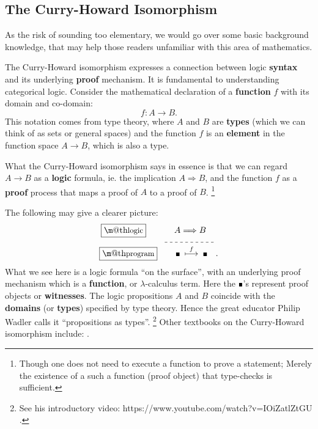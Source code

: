 \documentclass[orivec]{llncs}
\makeatletter
\newcommand{\witness}{\scalebox{0.6}{$\blacksquare$}}
\newcommand{\underdash}[1]{%
	\tikz[baseline=(toUnderline.base)]{
		\node[inner sep=1pt,outer sep=10pt] (toUnderline) {#1};
		\draw[dashed] ([yshift=-0pt]toUnderline.south west) -- ([yshift=-0pt]toUnderline.south east);
	}%
}%
\renewcommand{\boxed}[1]{\fbox{\m@th$\displaystyle\scalebox{0.9}{#1}$} \,}
\makeatother
\begin{document}
\subsection{The Curry-Howard Isomorphism}

As the risk of sounding too elementary, we would go over some basic background knowledge, that may help those readers unfamiliar with this area of mathematics.

The Curry-Howard isomorphism expresses a connection between logic \textbf{syntax} and its underlying \textbf{proof} mechanism.  It is fundamental to understanding categorical logic.  Consider the mathematical declaration of a \textbf{function} $f$ with its domain and co-domain:
\begin{equation}
f: A \rightarrow B .
\end{equation}
This notation comes from type theory, where $A$ and $B$ are \textbf{types} (which we can think of as sets or general spaces) and the function $f$ is an \textbf{element} in the function space $A \rightarrow B$, which is also a type.

What the Curry-Howard isomorphism says in essence is that we can regard $A \rightarrow B$ as a \textbf{logic} formula, ie. the implication $A \Rightarrow B$, and the function $f$ as a \textbf{proof} process that maps a proof of $A$ to a proof of $B$. \footnote{ Though one does not need to execute a function to prove a statement;  Merely the existence of a such a function (proof object) that type-checks is sufficient. }

The following may give a clearer picture:
\begin{equation}
\label{eqn:Curry-Howard}
\begin{aligned}
\boxed{\mbox{logic}} \quad \quad \underdash{$A \Longrightarrow B$} & \\
\boxed{\mbox{program}} \quad \quad \witness \; \stackrel{f}{\longmapsto} \; \witness \hspace*{10pt} & .
\end{aligned}
\end{equation}
What we see here is a logic formula ``on the surface'', with an underlying proof mechanism which is a \textbf{function}, or $\lambda$-calculus term.  Here the $\witness$'s represent proof objects or \textbf{witnesses}.  The logic propositions $A$ and $B$ coincide with the \textbf{domains} (or \textbf{types}) specified by type theory.  Hence the great educator Philip Wadler calls it ``propositions as types''. \footnote{See his introductory video: https://www.youtube.com/watch?v=IOiZatlZtGU .} 
Other textbooks on the Curry-Howard isomorphism include: \cite{Sorensen2006} \cite{Simmons2000} \cite{Thompson1991}.
\end{document}

